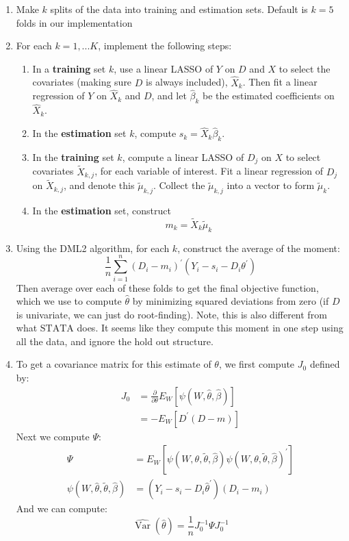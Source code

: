 \documentclass[11pt]{article}
\begin{document}
\begin{enumerate}
	\item Make $k$  splits of the data into training and estimation sets. Default is $k = 5$ folds in our implementation
	\item For each $k = 1, ... K$, implement the following steps:
  \begin{enumerate}
    \item In a \textbf{training} set $k$, use a linear LASSO of $Y$ on $D$ and $X$ to select the covariates (making sure $D$ is always included), $\hat{X}_k$. Then fit a linear regression of $Y$ on $\hat{X}_k$ and $D$, and let $\hat{\beta}_k$ be the estimated coefficients on $\hat{X}_k$.
  	\item In the \textbf{estimation} set $k$, compute $s_k = \hat{X}_k\hat{\beta}_k$.
  	\item In the \textbf{training} set $k$, compute a linear LASSO of $D_j$ on $X$ to select covariates $\tilde{X}_{k, j}$, for each variable of interest. Fit a linear regression of $D_j$ on $\tilde{X}_{k, j}$, and denote this $\tilde{\mu}_{k,j}$. Collect the $\tilde{\mu}_{k,j}$ into a vector to form $\tilde{\mu}_k$.
  	\item In the \textbf{estimation} set, construct
    $$m_k = \tilde{X}_k\tilde{\mu}_k$$
  \end{enumerate}
	\item Using the DML2 algorithm, for each $k$, construct the average of the moment:
	$$\frac{1}{n} \sum_{i=1}^{n}(D_i - m_{i})^{\prime}\left({Y}_{i}- s_i -D_{i} \theta^{\prime}\right) $$
	Then average over each of these folds to get the final objective function, which we use to compute $\hat{\theta}$ by minimizing squared deviations from zero (if $D$ is univariate, we can just do root-finding).
	Note, this is also different from what $\mathrm{STATA}$ does. It seems like they compute this moment in one step using all the data, and ignore the hold out structure.
	\item To get a covariance matrix for this estimate of $\theta$, we first compute $J_0$ defined by:
	$$
	\begin{aligned}
	J_{0} &=\frac{\partial}{\partial \theta} E_{W} \left[\psi(W, \hat{\theta}, \hat{\beta})\right] \\
	&=-E_{W}\left[D^{\prime} (D-m)\right]
	\end{aligned}$$
	Next we compute $\Psi:$
	$$
	\begin{aligned}
	\Psi &=E_{W}\left[\psi(W, \theta, \tilde{\theta}, \hat{\beta}) \psi(W, \theta, \tilde{\theta}, \hat{\beta})^{\prime}\right] \\
	\psi(W, \hat{\theta}, \tilde{\theta}, \hat{\beta}) &= (Y_{i}- s_i - D_{i} \hat{\theta}^{\prime}) (D_i - m_i)
	\end{aligned}
	$$
	And we can compute:
	$$\hat{\operatorname{Var}}(\hat{\theta})=\frac{1}{n} J_{0}^{-1} \Psi J_{0}^{-1}$$
\end{enumerate}
\end{document}
